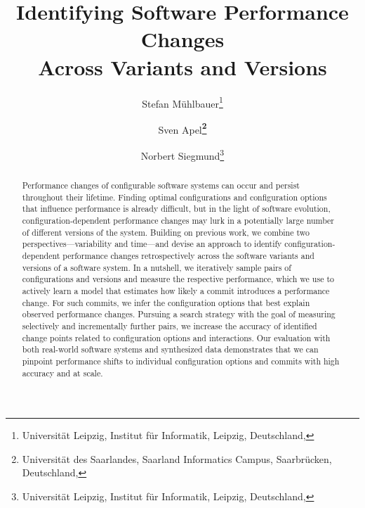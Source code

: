 \documentclass[utf8,biblatex]{lni}
\begin{document}
\title[Identifying Software Performance Changes Across Variants and Versions]{Identifying Software Performance Changes\\ Across Variants and Versions}
\author[Stefan Mühlbauer \and Sven Apel \and Norbert Siegmund]
{Stefan Mühlbauer\footnote{Universität Leipzig, Institut für Informatik, Leipzig, Deutschland, } \and
Sven Apel\textbf{\footnote{Universität des Saarlandes, Saarland Informatics Campus, Saarbrücken, Deutschland, }} \and
Norbert Siegmund\footnote{Universität Leipzig, Institut für Informatik, Leipzig, Deutschland, }
}
\maketitle

\begin{abstract}
Performance changes of configurable software systems can occur and persist throughout their lifetime. Finding optimal configurations and configuration options that influence performance is already difficult, but in the light of software evolution, configuration-dependent performance changes may lurk in a potentially large number of different versions of the system. 
Building on previous work, we combine two perspectives---variability and time---and devise an approach to identify configuration-dependent performance changes retrospectively across the software variants and versions of a software system. In a nutshell, we iteratively sample pairs of configurations and versions and measure the respective performance, which we use to actively learn a model that estimates how likely a commit introduces a performance change. For such commits, we infer the configuration options that best explain observed performance changes. 
Pursuing a search strategy with the goal of measuring selectively and incrementally further pairs, we increase the accuracy of identified change points related to configuration options and interactions.
Our evaluation with both real-world software systems and synthesized data demonstrates that we can pinpoint performance shifts to individual configuration options and commits with high accuracy and at scale. 
\end{abstract}
\end{document}
